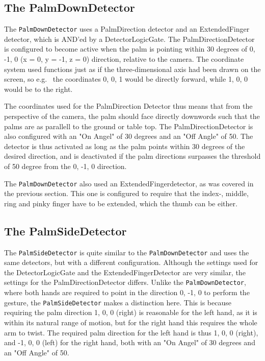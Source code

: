 \subsection{The PalmDownDetector}
The \texttt{PalmDownDetector} uses a PalmDirection detector and an ExtendedFinger detector, which is AND'ed by a DetectorLogicGate. 
The PalmDirectionDetector is configured to become active when the palm is pointing within 30 degrees of {0, -1, 0} (x = 0, y = -1, z = 0) direction, relative to the camera.
The coordinate system used functions just as if the three-dimensional axis had been drawn on the screen, so e.g.~ the coordinates {0, 0, 1} would be directly forward, while
{1, 0, 0} would be to the right.

The coordinates used for the PalmDirection Detector thus means that from the perspective of the camera, the palm should face directly downwords such that the 
palms are as parallell to the ground or table top.
The PalmDirectionDetector is also configured with an "On Angel" of 30 degrees and an "Off Angle" of 50. The detector is thus activated as long as the palm points within 
30 degrees of the desired direction, and is deactivated if the palm directions surpasses the threshold of 50 degree from the {0, -1, 0} direction.

The \texttt{PalmDownDetector} also used an ExtendedFingerdetector, as was covered in the previous section. This one is configured to require that 
the index-, middle, ring and pinky finger have to be extended, which the thumb can be either. 

\subsection{The PalmSideDetector}
The \texttt{PalmSideDetector} is quite similar to the \texttt{PalmDownDetector} and uses the same detectors, but with a different configuration. 
Although the settings used for the DetectorLogicGate and the ExtendedFingerDetector are very similar, the settings for the PalmDirectionDetector differs.
Unlike the \texttt{PalmDownDetector}, where both hands are required to point in the direction {0, -1, 0} to perform the gesture, the \texttt{PalmSideDetector} makes 
a distinction here. This is because requiring the palm direction {1, 0, 0} (right) is reasonable for the left hand, as it is within its natural range of motion, but
for the right hand this requires the whole arm to twist. The required palm direction for the left hand is thus {1, 0, 0} (right), and {-1, 0, 0} (left) for the right hand, both
with an "On Angel" of 30 degrees and an "Off Angle" of 50.

